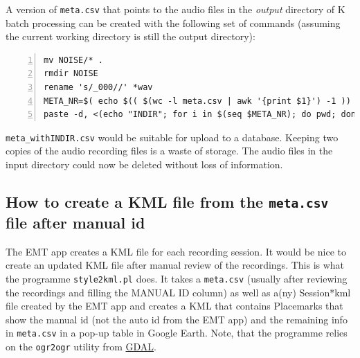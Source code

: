 \documentclass[English, 11pt, twoside, authoryear]{article}
\begin{document}


A version of \texttt{meta.csv} that points to the audio files in the \emph{output} directory of \textsf{K} batch processing can be created with the following set of commands (assuming the current working directory is still the output directory):

\begin{lstlisting}[numbers=left]
mv NOISE/* .
rmdir NOISE
rename 's/_000//' *wav
META_NR=$( echo $(( $(wc -l meta.csv | awk '{print $1}') -1 )) )
paste -d, <(echo "INDIR"; for i in $(seq $META_NR); do pwd; done) meta.csv > meta_withINDIR.csv
\end{lstlisting}

\texttt{meta\_withINDIR.csv} would be suitable for upload to a database.
Keeping two copies of the audio recording files is a waste of storage.  The audio files in the input directory could now be deleted without loss of information.
 
%
%
\subsection{How to create a KML file from the \texttt{meta.csv} file after manual id}
%
%
The EMT app creates a KML file for each recording session. It would be nice to create an updated KML file after manual review of the recordings. This is what the programme \texttt{style2kml.pl} does. It takes a \texttt{meta.csv} (usually after reviewing the recordings and filling the MANUAL ID column) as well as a(ny) Session*kml file created by the EMT app and creates a KML that contains Placemarks that show the manual id (not the auto id from the EMT app) and the remaining info in \texttt{meta.csv} in a pop-up table in Google Earth. Note, that the programme relies on the \texttt{ogr2ogr} utility from \href{https://gdal.org/download.html}{GDAL}.
\end{document}
